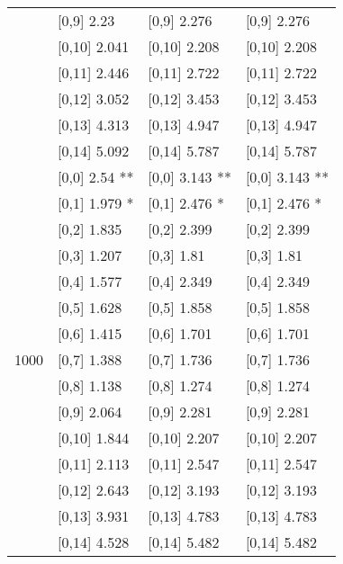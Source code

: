 \begin{table}
\begin{tabular}[t]{llll}
 & {}[0,9] 2.23 & {}[0,9] 2.276 & {}[0,9] 2.276\\
\addlinespace
 & {}[0,10] 2.041 & {}[0,10] 2.208 & {}[0,10] 2.208\\
 & {}[0,11] 2.446 & {}[0,11] 2.722 & {}[0,11] 2.722\\
 & {}[0,12] 3.052 & {}[0,12] 3.453 & {}[0,12] 3.453\\
 & {}[0,13] 4.313 & {}[0,13] 4.947 & {}[0,13] 4.947\\
 & {}[0,14] 5.092 & {}[0,14] 5.787 & {}[0,14] 5.787\\
\addlinespace
 & {}[0,0] 2.54 ** & {}[0,0] 3.143 ** & {}[0,0] 3.143 **\\
 & {}[0,1] 1.979 * & {}[0,1] 2.476 * & {}[0,1] 2.476 *\\
 & {}[0,2] 1.835 & {}[0,2] 2.399 & {}[0,2] 2.399\\
 & {}[0,3] 1.207 & {}[0,3] 1.81 & {}[0,3] 1.81\\
 & {}[0,4] 1.577 & {}[0,4] 2.349 & {}[0,4] 2.349\\
\addlinespace
 & {}[0,5] 1.628 & {}[0,5] 1.858 & {}[0,5] 1.858\\
 & {}[0,6] 1.415 & {}[0,6] 1.701 & {}[0,6] 1.701\\
1000 & {}[0,7] 1.388 & {}[0,7] 1.736 & {}[0,7] 1.736\\
 & {}[0,8] 1.138 & {}[0,8] 1.274 & {}[0,8] 1.274\\
 & {}[0,9] 2.064 & {}[0,9] 2.281 & {}[0,9] 2.281\\
\addlinespace
 & {}[0,10] 1.844 & {}[0,10] 2.207 & {}[0,10] 2.207\\
 & {}[0,11] 2.113 & {}[0,11] 2.547 & {}[0,11] 2.547\\
 & {}[0,12] 2.643 & {}[0,12] 3.193 & {}[0,12] 3.193\\
 & {}[0,13] 3.931 & {}[0,13] 4.783 & {}[0,13] 4.783\\
 & {}[0,14] 4.528 & {}[0,14] 5.482 & {}[0,14] 5.482\\
\bottomrule
\end{tabular}
\end{table}

